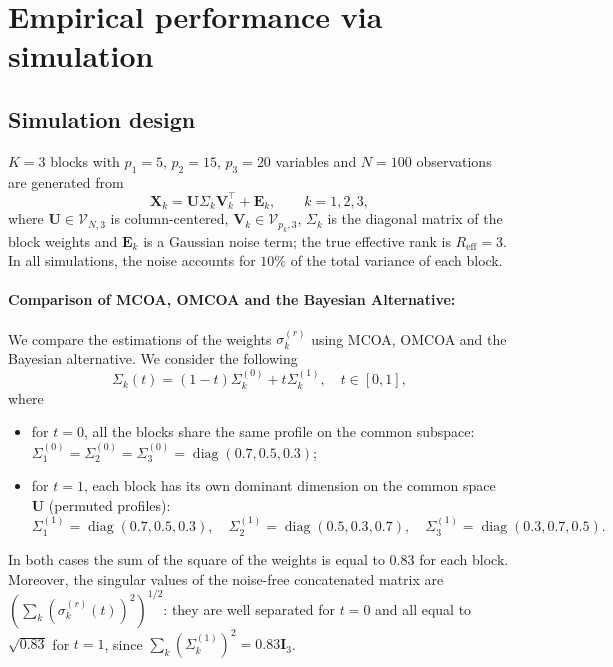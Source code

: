 \documentclass[11pt]{article}
\DeclareMathOperator{\diag}{diag}
\newcommand{\X}{\mathbf{X}}
\newcommand{\U}{\mathbf{U}}
\newcommand{\V}{\mathbf{V}}
\newcommand{\EE}{\mathbf{E}}
\newcommand{\Stiefel}[2]{\mathcal V_{#1,#2}}
\begin{document}
\section{Empirical performance via simulation}

\subsection{Simulation design}
$K=3$ blocks with $p_1=5$, $p_2=15$, $p_3=20$ variables and $N=100$ observations are generated from
\[
  \X_k=\U\Sigma_k\V_k^\intercal+\EE_k,\qquad k=1,2,3,
\]
where $\U\in\Stiefel{N}{3}$ is column-centered, $\V_k\in\Stiefel{p_k}{3}$, $\Sigma_k$ is the diagonal matrix of the block weights and $\EE_k$ is a Gaussian noise term; the true effective rank is $R_{\mathrm{eff}}=3$. In all simulations, the noise accounts for $10\%$ of the total variance of each block.


\paragraph{Comparison of MCOA, OMCOA and the Bayesian Alternative:} We compare the estimations of the weights $\sigma_k^{(r)}$ using MCOA, OMCOA and the Bayesian alternative. We consider the following  
\begin{equation}
	\Sigma_k(t)=(1-t)\Sigma_k^{(0)}+t\Sigma_k^{(1)}, \quad t\in[0,1],
\end{equation}
where 
\begin{itemize}
	\item for $t=0$, all the blocks share the same profile on the common subspace: $\Sigma_1^{(0)}=\Sigma_2^{(0)}=\Sigma_3^{(0)}=\diag(0.7,0.5,0.3)$;
	\item for $t=1$, each block has its own dominant dimension on the common space $\U$ (permuted profiles): $\Sigma_1^{(1)}=\diag(0.7,0.5,0.3),\quad \Sigma_2^{(1)}=\diag(0.5,0.3,0.7),\quad \Sigma_3^{(1)}=\diag(0.3,0.7,0.5).$
\end{itemize}
In both cases the sum of the square of the weights is equal to $0.83$ for each block. Moreover, the singular values of the noise-free concatenated matrix are $(\sum_k (\sigma_k^{(r)}(t))^2)^{1/2}$: they are well separated for $t=0$ and all equal to $\sqrt{0.83}$ for $t=1$, since  
$\sum_k(\Sigma_k^{(1)})^2=0.83\textbf{I}_3$.
\end{document}

